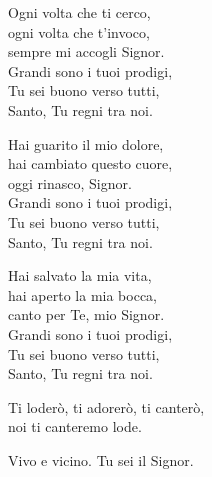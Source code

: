 
\strofa Ogni volta che ti cerco,\\
ogni volta che t'invoco,\\
sempre mi accogli Signor.\\
Grandi sono i tuoi prodigi,\\
Tu sei buono verso tutti,\\
Santo, Tu regni tra noi.

\spazio


\spazio

\strofa Hai guarito il mio dolore,\\
hai cambiato questo cuore,\\
oggi rinasco, Signor.\\
Grandi sono i tuoi prodigi,\\
Tu sei buono verso tutti,\\
Santo, Tu regni tra noi.

\spazio


\spazio

\strofa Hai salvato la mia vita,\\
hai aperto la mia bocca,\\
canto per Te, mio Signor.\\
Grandi sono i tuoi prodigi,\\
Tu sei buono verso tutti,\\
Santo, Tu regni tra noi.

\spazio


\spazio

Ti loderò, ti adorerò, ti canterò,\\
noi ti canteremo lode.

\spazio

  

\spazio

Vivo e vicino. Tu sei il Signor.

\spazio

